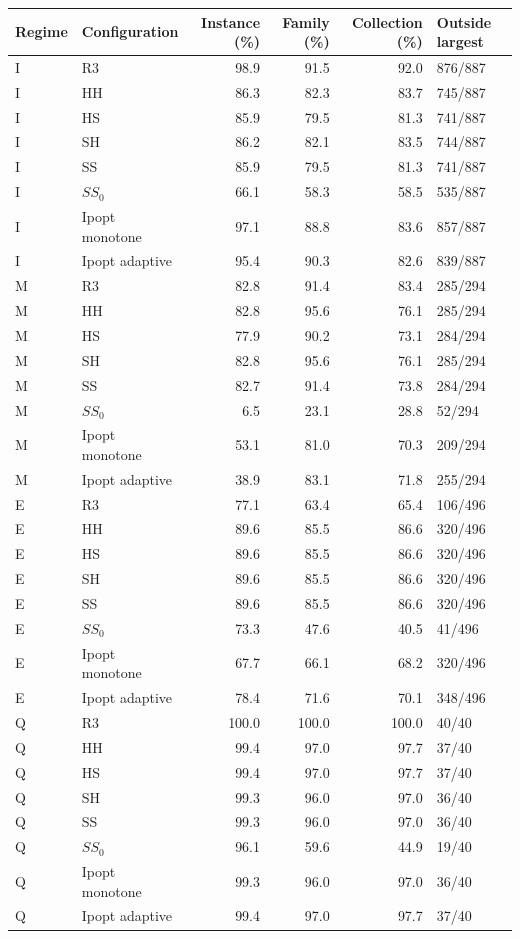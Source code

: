 \begin{tabular}{@{}llrrrl@{}}
\toprule
Regime & Configuration & Instance (\%) & Family (\%) & Collection (\%) & Outside largest\\
\midrule
I & R3 & 98.9 & 91.5 & 92.0 & 876/887\\
I & HH & 86.3 & 82.3 & 83.7 & 745/887\\
I & HS & 85.9 & 79.5 & 81.3 & 741/887\\
I & SH & 86.2 & 82.1 & 83.5 & 744/887\\
I & SS & 85.9 & 79.5 & 81.3 & 741/887\\
I & $SS_0$ & 66.1 & 58.3 & 58.5 & 535/887\\
I & Ipopt monotone & 97.1 & 88.8 & 83.6 & 857/887\\
I & Ipopt adaptive & 95.4 & 90.3 & 82.6 & 839/887\\
M & R3 & 82.8 & 91.4 & 83.4 & 285/294\\
M & HH & 82.8 & 95.6 & 76.1 & 285/294\\
M & HS & 77.9 & 90.2 & 73.1 & 284/294\\
M & SH & 82.8 & 95.6 & 76.1 & 285/294\\
M & SS & 82.7 & 91.4 & 73.8 & 284/294\\
M & $SS_0$ & 6.5 & 23.1 & 28.8 & 52/294\\
M & Ipopt monotone & 53.1 & 81.0 & 70.3 & 209/294\\
M & Ipopt adaptive & 38.9 & 83.1 & 71.8 & 255/294\\
E & R3 & 77.1 & 63.4 & 65.4 & 106/496\\
E & HH & 89.6 & 85.5 & 86.6 & 320/496\\
E & HS & 89.6 & 85.5 & 86.6 & 320/496\\
E & SH & 89.6 & 85.5 & 86.6 & 320/496\\
E & SS & 89.6 & 85.5 & 86.6 & 320/496\\
E & $SS_0$ & 73.3 & 47.6 & 40.5 & 41/496\\
E & Ipopt monotone & 67.7 & 66.1 & 68.2 & 320/496\\
E & Ipopt adaptive & 78.4 & 71.6 & 70.1 & 348/496\\
Q & R3 & 100.0 & 100.0 & 100.0 & 40/40\\
Q & HH & 99.4 & 97.0 & 97.7 & 37/40\\
Q & HS & 99.4 & 97.0 & 97.7 & 37/40\\
Q & SH & 99.3 & 96.0 & 97.0 & 36/40\\
Q & SS & 99.3 & 96.0 & 97.0 & 36/40\\
Q & $SS_0$ & 96.1 & 59.6 & 44.9 & 19/40\\
Q & Ipopt monotone & 99.3 & 96.0 & 97.0 & 36/40\\
Q & Ipopt adaptive & 99.4 & 97.0 & 97.7 & 37/40\\
\bottomrule
\end{tabular}
